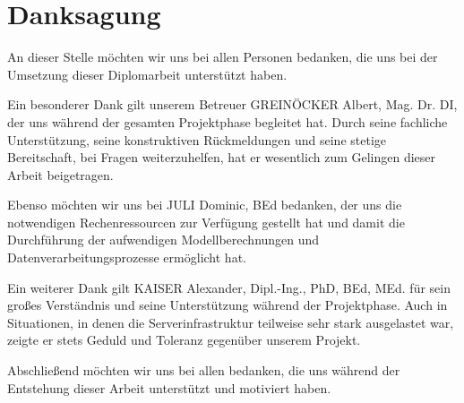 \chapter*{Danksagung}

An dieser Stelle möchten wir uns bei allen Personen bedanken, die uns bei der Umsetzung dieser Diplomarbeit unterstützt haben.

Ein besonderer Dank gilt unserem Betreuer GREINÖCKER Albert, Mag. Dr. DI, der uns während der gesamten Projektphase begleitet hat. Durch seine fachliche Unterstützung, seine konstruktiven Rückmeldungen und seine stetige Bereitschaft, bei Fragen weiterzuhelfen, hat er wesentlich zum Gelingen dieser Arbeit beigetragen.

Ebenso möchten wir uns bei JULI Dominic, BEd bedanken, der uns die notwendigen Rechenressourcen zur Verfügung gestellt hat und damit die Durchführung der aufwendigen Modellberechnungen und Datenverarbeitungsprozesse ermöglicht hat.

Ein weiterer Dank gilt KAISER Alexander, Dipl.-Ing., PhD, BEd, MEd. für sein großes Verständnis und seine Unterstützung während der Projektphase. Auch in Situationen, in denen die Serverinfrastruktur teilweise sehr stark ausgelastet war, zeigte er stets Geduld und Toleranz gegenüber unserem Projekt.

Abschließend möchten wir uns bei allen bedanken, die uns während der Entstehung dieser Arbeit unterstützt und motiviert haben.
